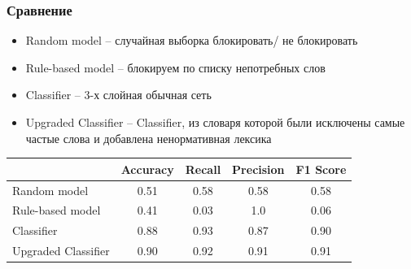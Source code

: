\documentclass[xetex,mathserif,serif]{beamer}
\begin{document}
	\begin{frame}
		\frametitle{Сравнение}
    		\begin{itemize}
    			\item Random model – случайная выборка блокировать/ не блокировать
    			\item Rule-based model – блокируем по списку непотребных слов
    			\item Classifier – 3-х слойная обычная сеть
    			\item Upgraded Classifier – Classifier, из словаря которой были исключены самые частые слова и добавлена ненормативная лексика
    		\end{itemize}
            \begin{table}[]
                \begin{tabular}{|l|c|c|c|c|}
                \hline
                                    & Accuracy & Recall & Precision & F1 Score \\ \hline
                Random model        & 0.51     & 0.58   & 0.58      & 0.58     \\ \hline
                Rule-based model    & 0.41     & 0.03   & 1.0       & 0.06     \\ \hline
                Classifier          & 0.88     & 0.93   & 0.87      & 0.90     \\ \hline
                Upgraded Classifier & 0.90     & 0.92   & 0.91      & 0.91     \\ \hline
                \end{tabular}
            \end{table}

	\end{frame}		
	
\end{document}
